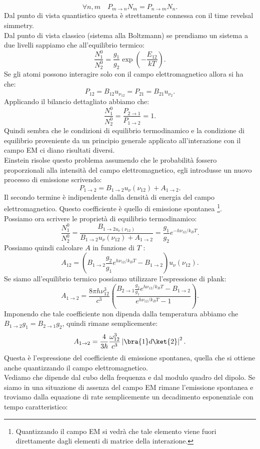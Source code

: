 \[
\forall n,m \quad P_{m\to n}N_m = P_{n\to m}N_n 
.\] 
Dal punto di vista quantistico questa è strettamente connessa con il time revelsal simmetry.\\
Dal punto di vista classico (sistema alla Boltzmann) se prendiamo un sistema a due livelli sappiamo che all'equilibrio termico:
\[
    \frac{N_1^0}{N_2^0}= \frac{g_1}{g_2}\exp\left(-\frac{E_{12}}{kT}\right)
.\] 
Se gli atomi possono interagire solo con il campo elettromagnetico allora si ha che:
\[
P_{12} = B_{12}u_{\nu_{12}}=P_{21}=B_{21}u_{\nu_2}
.\] 
Applicando il bilancio dettagliato abbiamo che:
\[
\frac{N_1^0}{N_2^0} = \frac{P_{2\to 1}}{P_{1\to 2}} = 1
.\] 
Quindi sembra che le condizioni di equilibrio termodinamico e la condizione di equilibrio proveniente da un principio generale applicato all'interazione con il campo EM ci diano risultati diversi. \\
Einstein risolse questo problema assumendo che le probabilità fossero proporzionali alla intensità del campo elettromagnetico, egli introdusse un nuovo processo di emissione scrivendo:
\[
    P_{1\to 2}= B_{1\to 2}u_{\nu}(\nu_{12})  + A_{1\to 2}
.\] 
Il secondo termine è indipendente dalla densità di energia del campo elettromagnetico. Questo coefficiente è quello di emissione spontanea \footnote{Quantizzando il campo EM si vedrà che tale elemento viene fuori direttamente dagli elementi di matrice della interazione.}.\\
Possiamo ora scrivere le proprietà di equilibrio termodinamico:
\[
    \frac{N_1^0}{N_2^0} = \frac{B_{1\to 2 u_\nu(\nu_{12})}}{B_{1\to 2}u_\nu(\nu_{12}) + A_{1\to 2}} = \frac{g_1}{g_2}e^{-h\nu_{12} /k_BT}
.\] 
Possiamo quindi calcolare $A$  in funzione di $T$  :
\[
    A_{12} = \left(B_{1\to 2}\frac{g_2}{g_1}e^{h\nu_{12} /k_BT}-B_{1\to 2}\right)u_\nu(\nu_{12}) 
.\] 
Se siamo all'equilibrio termico possiamo utilizzare l'espressione di plank:
\[
A_{1\to 2} =
\frac{8\pi h\nu_{12}^3}{c^3}\left(\frac{B_{2\to 1}\frac{g_2}{g_1}e^{h\nu_{12} /k_BT}-B_{1\to 2}}{e^{h\nu_{12} /k_BT}-1}\right)
.\] 
Imponendo che tale coefficiente non dipenda dalla temperatura abbiamo che $B_{1\to 2}g_1=B_{2\to 1}g_2$, quindi rimane semplicemente:
\[
A_{1\to 2}=\frac{4}{3\hbar }\frac{\omega_{12}^3}{c ^3}\left|\bra{1}d\ket{2}\right|^2
.\] 
Questa è l'espressione del coefficiente di emissione spontanea, quella che si ottiene anche quantizzando il campo elettromagnetico.\\
Vediamo che dipende dal cubo della frequenza e dal modulo quadro del dipolo. Se siamo in una situazione di assenza del campo EM rimane l'emissione spontanea e troviamo dalla equazione di rate semplicemente un decadimento esponenziale con tempo caratteristico:
